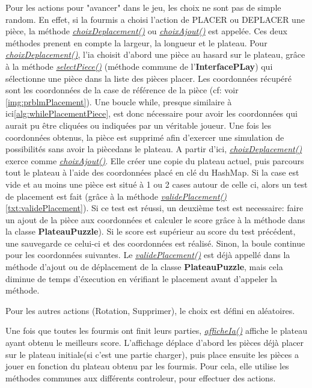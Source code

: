         Pour les actions pour "avancer" dans le jeu, les choix ne sont pas de simple random. En effet, si la fourmis a choisi l'action de PLACER ou DEPLACER une pièce, la méthode \underline{\textit{choixDeplacement()}} ou \underline{\textit{choixAjout()}} est appelée. Ces deux méthodes prenent en compte la largeur, la longueur et le plateau.
        Pour \underline{\textit{choixDeplacement()}}, l'ia choisit d'abord une pièce au hasard sur le plateau, grâce à la méthode \underline{\textit{selectPiece()}} (méthode commune de l'\textbf{InterfacePLay}) qui sélectionne une pièce dans la liste des pièces placer. Les coordonnées récupéré sont les coordonnées de la case de référence de la pièce (cf: voir \ref{img:prblmPlacement}). Une boucle while, presque similaire  à ici\ref{alg:whilePlacementPiece}, est donc nécessaire pour avoir les coordonnées qui aurait pu être cliquées ou indiquées par un véritable joueur. Une fois les coordonnées obtenus, la pièce est supprimé afin d'exercer une simulation de possibilités sans avoir la piècedans le plateau.
        A partir d'ici, \underline{\textit{choixDeplacement()}} exerce comme \underline{\textit{choixAjout()}}. Elle créer une copie du plateau actuel, puis parcours tout le plateau à l'aide des coordonnées placé en clé du HashMap. Si la case est vide et au moins une pièce est situé à 1 ou 2 cases autour de celle ci, alors un test de placement est fait (grâce à la méthode \underline{\textit{validePlacement()}}\ref{txt:validePlacement}). Si ce test est réussi, un deuxième test est necessaire: faire un ajout de la pièce aux coordonnées et calculer le score grâce à la méthode dans la classe \textbf{PlateauPuzzle}). Si le score est supérieur au score du test précédent, une sauvegarde ce celui-ci et des coordonnées est réalisé. Sinon, la boule continue pour les coordonnées suivantes.
        Le \underline{\textit{validePlacement()}} est déjà appellé dans la méthode d'ajout ou de déplacement de la classe \textbf{PlateauPuzzle}, mais cela diminue de temps d'éxecution en vérifiant le placement avant d'appeler la méthode.

        Pour les autres actions (Rotation, Supprimer), le choix est défini en aléatoires.

        Une fois que toutes les fourmis ont finit leurs parties, \underline{\textit{afficheIa()}} affiche le plateau ayant obtenu le meilleurs score. L'affichage déplace d'abord les pièces déjà placer sur le plateau initiale(si c'est une partie charger), puis place ensuite les pièces a jouer en fonction du plateau obtenu par les fourmis. Pour cela, elle utilise les méthodes communes aux différents controleur, pour effectuer des actions.

